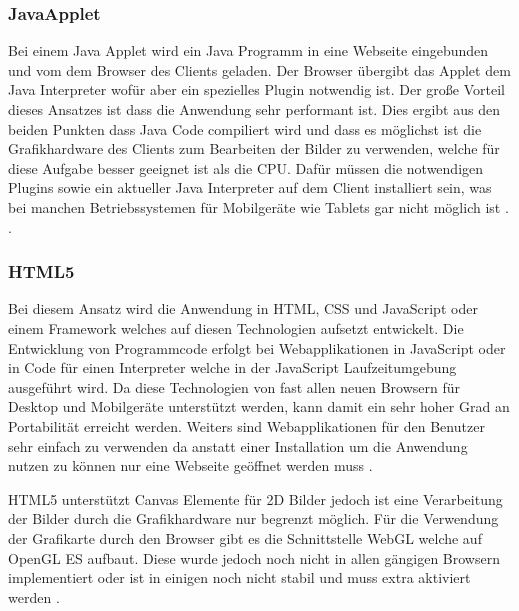\subsubsection{JavaApplet}
\label{sec:JavaApplet}
Bei einem Java Applet \cite{japp} wird ein Java Programm in eine Webseite eingebunden und vom dem Browser des Clients geladen.
Der Browser übergibt das Applet dem Java Interpreter wofür aber ein spezielles Plugin notwendig ist. 
%
Der große Vorteil dieses Ansatzes ist dass die Anwendung sehr performant ist.
Dies ergibt aus den beiden Punkten dass Java Code compiliert wird und dass es möglichst ist die Grafikhardware des Clients zum Bearbeiten der Bilder zu verwenden,
welche für diese Aufgabe besser geeignet ist als die CPU.
%
Dafür müssen die notwendigen Plugins sowie ein aktueller Java Interpreter auf dem Client installiert sein, 
was bei manchen Betriebssystemen für Mobilgeräte wie Tablets gar nicht möglich ist \cite{japp}. 
.


\subsubsection{HTML5}
\label{sec:HTML5}
Bei diesem Ansatz wird die Anwendung in HTML, CSS und JavaScript oder einem Framework welches auf diesen Technologien aufsetzt entwickelt.
Die Entwicklung von Programmcode erfolgt bei Webapplikationen in JavaScript oder in Code für einen Interpreter welche in der JavaScript Laufzeitumgebung ausgeführt wird.
Da diese Technologien von fast allen neuen Browsern für Desktop und Mobilgeräte unterstützt werden, kann damit ein sehr hoher Grad an Portabilität erreicht werden.
Weiters sind Webapplikationen für den Benutzer sehr einfach zu verwenden da anstatt einer Installation um die Anwendung nutzen zu können nur eine Webseite geöffnet werden muss \cite{html}.

HTML5 \cite{html} unterstützt Canvas Elemente für 2D Bilder jedoch ist eine Verarbeitung der Bilder durch die Grafikhardware nur begrenzt möglich.
Für die Verwendung der Grafikarte durch den Browser gibt es die Schnittstelle WebGL \cite{webgl-14} welche auf OpenGL ES \cite{opengl-es-sepc} aufbaut.
Diese wurde jedoch noch nicht in allen gängigen Browsern implementiert oder ist in einigen noch nicht stabil und muss extra aktiviert werden \cite{webgl-14}.


